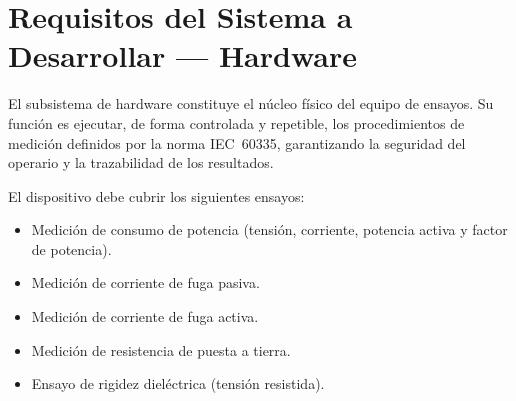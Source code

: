 %
%
%      
%

\section{Requisitos del Sistema a Desarrollar — Hardware}
\label{sec:requisitos_hw}

El subsistema de hardware constituye el núcleo físico del equipo de ensayos.
Su función es ejecutar, de forma controlada y repetible, los procedimientos
de medición definidos por la norma IEC~60335, garantizando la seguridad
del operario y la trazabilidad de los resultados.

El dispositivo debe cubrir los siguientes ensayos:

\begin{itemize}
    \item Medición de consumo de potencia (tensión, corriente, potencia activa y factor de potencia).
    \item Medición de corriente de fuga pasiva.
    \item Medición de corriente de fuga activa.
    \item Medición de resistencia de puesta a tierra.
    \item Ensayo de rigidez dieléctrica (tensión resistida).
\end{itemize}

